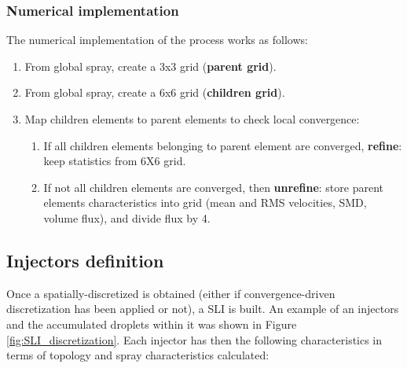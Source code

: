 \subsubsection{Numerical implementation}

The numerical implementation of the process works as follows:

\begin{enumerate}

	\item From global spray, create a 3x3 grid (\textbf{parent grid}).
	
	\item From global spray, create a 6x6 grid (\textbf{children grid}).
	
	\item Map children elements to parent elements to check local convergence:
	
	\begin{enumerate}
	
		\item If all children elements belonging to parent element are converged, \textbf{refine}: keep statistics from 6X6 grid.
		
		\item If not all children elements are converged, then \textbf{unrefine}: store parent elements characteristics into grid (mean and RMS velocities, SMD, volume flux),  and divide flux by 4.
	
	\end{enumerate}

\end{enumerate}



\subsection{Injectors definition}
\label{subsec:ch4_injectors_definition}

Once a spatially-discretized is obtained (either if convergence-driven discretization has been applied or not), a SLI is built. An example of an injectors and the accumulated droplets within it was shown in Figure \ref{fig:SLI_discretization}. Each injector has then the following characteristics in terms of topology and spray characteristics calculated:

